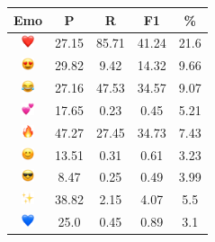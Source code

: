\documentclass{article}
\begin{document}
\begin{table}
\centering
\begin{tabular}{|c|ccc|c|} \hline
\textbf{Emo} & \textbf{P} & \textbf{R} & \textbf{F1} & \textbf{\%} \\ \hline
\includegraphics[height=0.37cm,width=0.37cm]{img/red_heart.png} & 27.15 & 85.71 & 41.24 & 21.6\\ 
\includegraphics[height=0.37cm,width=0.37cm]{img/smiling_face_with_hearteyes.png} & 29.82 & 9.42 & 14.32 & 9.66\\ 
\includegraphics[height=0.37cm,width=0.37cm]{img/face_with_tears_of_joy.png} & 27.16 & 47.53 & 34.57 & 9.07\\ 
\includegraphics[height=0.37cm,width=0.37cm]{img/two_hearts.png} & 17.65 & 0.23 & 0.45 & 5.21\\ 
\includegraphics[height=0.37cm,width=0.37cm]{img/fire.png} & 47.27 & 27.45 & 34.73 & 7.43\\ 
\includegraphics[height=0.37cm,width=0.37cm]{img/smiling_face_with_smiling_eyes.png} & 13.51 & 0.31 & 0.61 & 3.23\\ 
\includegraphics[height=0.37cm,width=0.37cm]{img/smiling_face_with_sunglasses.png} & 8.47 & 0.25 & 0.49 & 3.99\\ 
\includegraphics[height=0.37cm,width=0.37cm]{img/sparkles.png} & 38.82 & 2.15 & 4.07 & 5.5\\ 
\includegraphics[height=0.37cm,width=0.37cm]{img/blue_heart.png} & 25.0 & 0.45 & 0.89 & 3.1\\ 

\end{tabular}
\end{table}
\end{document}
